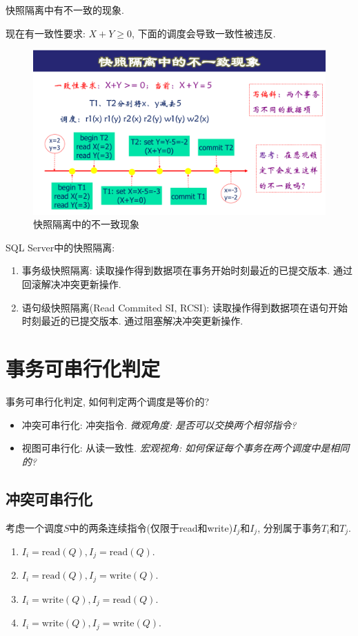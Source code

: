快照隔离中有不一致的现象.
\begin{example}
  现在有一致性要求: $X+Y\ge 0$, 下面的调度会导致一致性被违反.
  \begin{figure}[H]
      \centering
      \includegraphics[width=.5\textwidth]{./figure/快照隔离不一致.pdf}
      \caption{快照隔离中的不一致现象}
  \end{figure}
\end{example}

SQL Server中的快照隔离:
\begin{enumerate}
    \item 事务级快照隔离: 读取操作得到数据项在事务开始时刻最近的已提交版本. 通过回滚解决冲突更新操作.
    \item 语句级快照隔离(Read Commited SI, RCSI): 读取操作得到数据项在语句开始时刻最近的已提交版本. 通过阻塞解决冲突更新操作.
\end{enumerate}

\section{事务可串行化判定}

事务可串行化判定, 如何判定两个调度是等价的?
\begin{itemize}
  \item 冲突可串行化: 冲突指令. \textit{微观角度: 是否可以交换两个相邻指令?}
  \item 视图可串行化: 从读一致性. \textit{宏观视角: 如何保证每个事务在两个调度中是相同的?}
\end{itemize}

\subsection{冲突可串行化}

考虑一个调度$S$中的两条连续指令(仅限于read和write)$I_j$和$I_j$, 分别属于事务$T_i$和$T_j$.
\begin{enumerate}
    \item $I_i=\text{read}(Q), I_j=\text{read}(Q)$.
    \item $I_i=\text{read}(Q), I_j=\text{write}(Q)$.
    \item $I_i=\text{write}(Q), I_j=\text{read}(Q)$.
    \item $I_i=\text{write}(Q), I_j=\text{write}(Q)$.
\end{enumerate}

